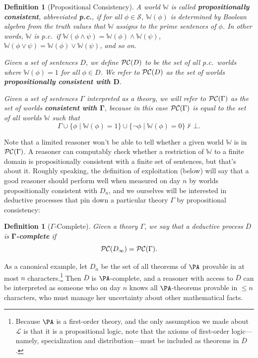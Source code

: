 \documentclass[authordate,onecolumn,noenvironments]{miri-tech-article}
\newtheorem{definition}[theorem]{Definition}
\numberwithin{equation}{subsection}
\newcommand{\seq}[1]{{\overline{#1}}}
\newcommand{\nn}{n}
\newcommand{\dt}{D}
\newcommand{\DP}{\seq{\dt}}
\newcommand{\pcworlds}{\mathcal{P\-C}}
\newcommand{\cworlds}{\mathcal{P\-C}} %
\newcommand{\World}{\mathbb{W}}
\newcommand{\Theory}{\Gamma}
\newcommand{\Lang}{\mathcal{L}}
\newcommand{\Sentences}{\mathcal{S}}
\begin{document}
\begin{definition}[Propositional Consistency]
  A world $\World$ is called \textbf{propositionally consistent}, abbreviated \textbf{p.c.}, if for all $\phi\in\Sentences$, $\World(\phi)$ is determined by Boolean algebra from the truth values that $\World$ assigns to the prime sentences of $\phi$. In other words, $\World$ is p.c.\ if $\World(\phi\land\psi) = \World(\phi) \land \World(\psi)$, $\World(\phi\lor\psi) = \World(\phi)\lor\World(\psi)$, and so on.

  Given a set of sentences $\dt$, we define $\pcworlds(\dt)$ to be the set of all p.c.\ worlds where $\World(\phi)=1$ for all $\phi\in\dt$. We refer to $\pcworlds(\dt)$ as the set of worlds \textbf{propositionally consistent with $\bm{D}$}.
  
  Given a set of sentences $\Theory$ interpreted as a theory, we will refer to $\pcworlds(\Theory)$ as the set of worlds \textbf{consistent with $\bm{\Theory}$}, because in this case $\pcworlds(\Theory)$ is equal to the set of all worlds $\World$ such that
  \[
    \Theory \cup \{\phi\mid \World(\phi)=1\} \cup \{\neg\phi \mid \World(\phi)=0\} \nvdash \bot.
  \]
\end{definition}

\noindent Note that a limited reasoner won't be able to tell whether a given world $\World$ is in $\cworlds(\Theory)$. A reasoner can computably check whether a restriction of $\World$ to a finite domain is propositionally consistent with a finite set of sentences, but that's about it. Roughly speaking, the definition of exploitation (below) will say that a good reasoner should perform well when measured on day $\nn$ by worlds propositionally consistent with $\dt_\nn$, and we ourselves will be interested in deductive processes that pin down a particular theory $\Theory$ by propositional consistency:

\begin{definition}[$\Theory$-Complete]
  Given a theory $\Theory$, we say that a deductive process $\DP$ is \textbf{$\bm{\Theory}$-complete} if
  \[
    \pcworlds(\dt_\infty) = \cworlds(\Theory).
  \]
\end{definition}

As a canonical example, let $\dt_\nn$ be the set of all theorems of $\PA$ provable in at most $\nn$ characters.\footnote{Because $\PA$ is a first-order theory, and the only assumption we made about $\Lang$ is that it is a propositional logic, note that the axioms of first-order logic---namely, specialization and distribution---must be included as theorems in $\DP$.} Then $\DP$ is $\PA$-complete, and a reasoner with access to $\DP$ can be interpreted as someone who on day $\nn$ knows all $\PA$-theorems provable in $\leq \nn$ characters, who must manage her uncertainty about other mathematical facts.
\end{document}
